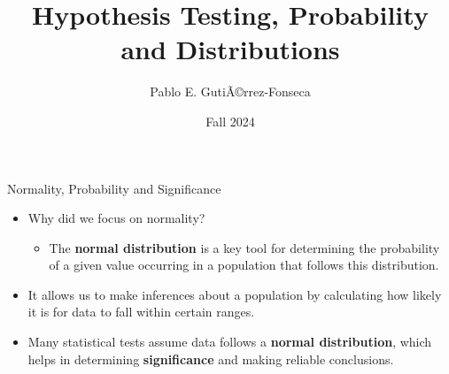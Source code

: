 \documentclass[
  ignorenonframetext,
]{beamer}
\title{Hypothesis Testing, Probability and Distributions}
\author{Pablo E. GutiÃ©rrez-Fonseca}
\date{Fall 2024}
\providecommand{\tightlist}{%
  \setlength{\itemsep}{0pt}\setlength{\parskip}{0pt}}
\begin{document}
\frame{\titlepage}

\begin{frame}{Normality, Probability and Significance}
\label{normality-probability-and-significance}
\begin{itemize}
\tightlist
\item
  Why did we focus on normality?

  \begin{itemize}
  \tightlist
  \item
    The \textbf{normal distribution} is a key tool for determining the
    probability of a given value occurring in a population that follows
    this distribution.
  \end{itemize}
\end{itemize}

\begin{itemize}
\tightlist
\item
  It allows us to make inferences about a population by calculating how
  likely it is for data to fall within certain ranges.
\end{itemize}

\begin{itemize}
\tightlist
\item
  Many statistical tests assume data follows a \textbf{normal
  distribution}, which helps in determining \textbf{significance} and
  making reliable conclusions.
\end{itemize}
\end{frame}
\end{document}
